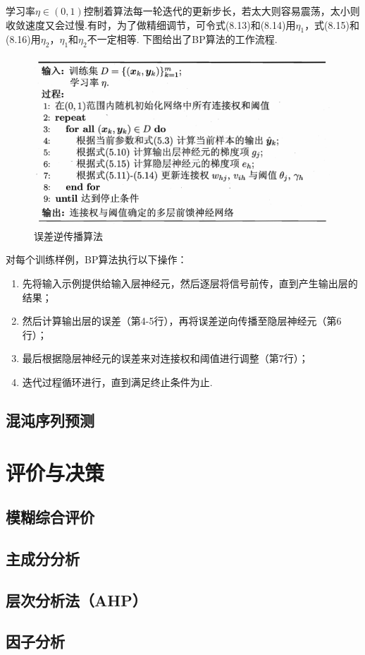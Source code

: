 \documentclass[openany]{progbookcn}
\begin{document}
\indent 学习率$\eta\in(0,1)$控制着算法每一轮迭代的更新步长，若太大则容易震荡，太小则收敛速度又会过慢.有时，为了做精细调节，可令式(8.13)和(8.14)用$\eta_1$，式(8.15)和(8.16)用$\eta_2$，$\eta_1$和$\eta_2$不一定相等.
\indent 下图给出了BP算法的工作流程.
\begin{figure}[H]
    \centering
    \includegraphics[width=0.6 \textwidth]{figs/chapter8/误差逆传播算法}
    \caption{误差逆传播算法}
\end{figure}
\indent 对每个训练样例，BP算法执行以下操作：
\begin{enumerate}[itemindent=2em]
    \item 先将输入示例提供给输入层神经元，然后逐层将信号前传，直到产生输出层的结果；
    \item 然后计算输出层的误差（第4-5行），再将误差逆向传播至隐层神经元（第6行）；
    \item 最后根据隐层神经元的误差来对连接权和阈值进行调整（第7行）；
    \item 迭代过程循环进行，直到满足终止条件为止.
\end{enumerate}
 

\section{混沌序列预测}
\chapter{评价与决策}
\section{模糊综合评价}
\section{主成分分析}
\section{层次分析法（AHP）}
\section{因子分析}
\end{document}
